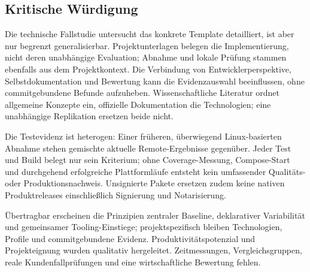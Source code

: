 \subsection{Kritische Würdigung}
\label{subsec:kritische-wuerdigung}

Die technische Fallstudie untersucht das konkrete Template detailliert, ist
aber nur begrenzt generalisierbar. Projektunterlagen belegen die Implementierung,
nicht deren unabhängige Evaluation; Abnahme und lokale Prüfung stammen
ebenfalls aus dem Projektkontext. Die Verbindung von Entwicklerperspektive,
Selbstdokumentation und Bewertung kann die Evidenzauswahl beeinflussen, ohne
commitgebundene Befunde aufzuheben. Wissenschaftliche Literatur ordnet
allgemeine Konzepte ein, offizielle Dokumentation die Technologien; eine
unabhängige Replikation ersetzen beide nicht.

Die Testevidenz ist heterogen: Einer früheren, überwiegend Linux-basierten
Abnahme stehen gemischte aktuelle Remote-Ergebnisse gegenüber. Jeder Test und
Build belegt nur sein Kriterium; ohne Coverage-Messung, Compose-Start und
durchgehend erfolgreiche Plattformläufe entsteht kein umfassender Qualitäts-
oder Produktionsnachweis. Unsignierte Pakete ersetzen zudem keine nativen
Produktreleases einschließlich Signierung und Notarisierung.

Übertragbar erscheinen die Prinzipien zentraler Baseline, deklarativer
Variabilität und gemeinsamer Tooling-Einstiege; projektspezifisch bleiben
Technologien, Profile und commitgebundene Evidenz. Produktivitätspotenzial und
Projekteignung wurden qualitativ hergeleitet. Zeitmessungen, Vergleichsgruppen,
reale Kundenfallprüfungen und eine wirtschaftliche Bewertung fehlen.
